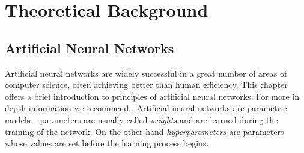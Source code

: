 \chapter{Theoretical Background}
\label{sec:chap2}

\section{Artificial Neural Networks}
Artificial neural networks are widely successful in a great number of areas of computer science, often achieving better than human efficiency. This chapter offers a brief introduction to principles of artificial neural networks. For more in depth information we recommend \cite{goodfellow_deep_2016}. Artificial neural networks are parametric models -- parameters are usually called \textit{weights} and are learned during the training of the network. On the other hand \textit{hyperparameters} are parameters whose values are set before the learning process begins. 


